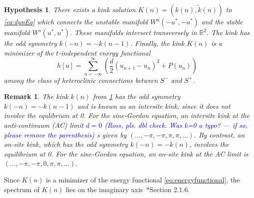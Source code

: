 \documentclass[12pt,reqno]{amsart}
\def\R{{\mathbb R}}
\newtheorem{hypothesis}{Hypothesis}
\newtheorem{remark}{Remark}
\newcommand{\revisedd}[2]{ \textcolor{blue}{#1} }
\begin{document}
\begin{hypothesis}\label{hyp:kinkexists}
There exists a kink solution $K(n) = (k(n),\tilde{k}(n))$ to \cref{eq:dynEq} which connects the unstable manifold $W^u(-u^*, -u^*)$ and the stable manifold $W^s(u^*, u^*)$. These manifolds intersect transversely in $\R^2$. 
The kink has the odd symmetry $k(-n) = -k(n-1)$. Finally, 
the kink $K(n)$ is a minimizer of the $t$-independent energy functional
\begin{equation}\label{eq:energyfunctional}
h[u] = \sum_{n=-\infty}^\infty 
\left( \frac{d}{2} (u_{n+1} - u_n)^2 + P(u_n) \right)
\end{equation}
{among the class of heteroclinic connections between $S^-$ and $S^+$.}
\end{hypothesis}

\begin{remark}
The kink $k(n)$ from \cref{hyp:kinkexists} has the odd symmetry $k(-n) = -k(n-1)$ and is known as an intersite kink, since it does not involve the equlibrium at 0. For the sine-Gordon equation, an intersite kink at the anti-continuum (AC) limit 
\revisedd{$d = 0$ (Ross, pls. dbl check. Was k=0 a typo? --- if so, please remove
the parenthesis)} is given by $(\dots, -\pi, -\pi, \pi, \pi, \dots)$. By contrast, an on-site kink, which has the odd symmetry $k(-n) = -k(n)$, involves the equilibrium at 0. For the sine-Gordon equation, an on-site kink at the AC limit is $(\dots, -\pi, -\pi, 0, \pi, \pi, \dots)$. 
\end{remark}

{Since $K(n)$ is a minimizer of the energy functional \cref{eq:energyfunctional}, the spectrum of $K(n)$ lies on the imaginary axis~\cite{KevrekidisWeinstein2000}*{Section 2.1.6}.}
\end{document}
